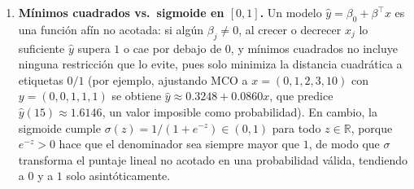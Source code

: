 \begin{enumerate}
\item \textbf{Mínimos cuadrados vs.\ sigmoide en $[0,1]$.}
Un modelo $\hat y=\beta_0+\beta^\top x$ es una función afín no acotada:
si algún $\beta_j\neq0$, al crecer o decrecer $x_j$ lo suficiente
$\hat y$ supera $1$ o cae por debajo de $0$, y mínimos cuadrados no
incluye ninguna restricción que lo evite, pues solo minimiza la
distancia cuadrática a etiquetas $0/1$ (por ejemplo, ajustando MCO a
$x=(0,1,2,3,10)$ con $y=(0,0,1,1,1)$ se obtiene
$\hat y\approx0.3248+0.0860x$, que predice $\hat y(15)\approx1.6146$, un
valor imposible como probabilidad). En cambio, la sigmoide cumple
$\sigma(z)=1/(1+e^{-z})\in(0,1)$ para todo $z\in\mathbb{R}$, porque
$e^{-z}>0$ hace que el denominador sea siempre mayor que $1$, de modo
que $\sigma$ transforma el puntaje lineal no acotado en una
probabilidad válida, tendiendo a $0$ y a $1$ solo asintóticamente.

\end{enumerate}
